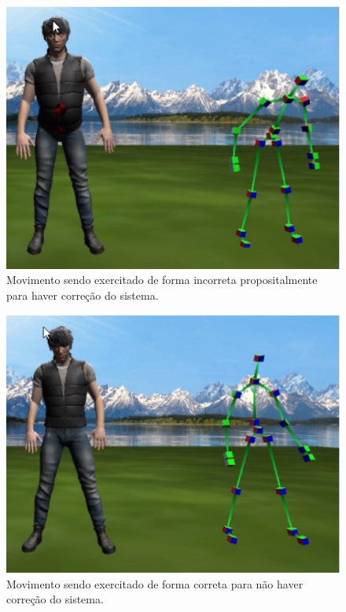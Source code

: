   \begin{figure}[H]
  \centering
  \includegraphics [keepaspectratio=true,scale=0.60]{figuras/colunaErrada.eps}
  \caption{Movimento sendo exercitado de forma incorreta propositalmente para haver correção do sistema.}
  \label{img:colunaErrada}
  \end{figure}

  \begin{figure}[H]
  \centering
  \includegraphics [keepaspectratio=true,scale=0.60]{figuras/cabecaCerta.eps}
  \caption{Movimento sendo exercitado de forma correta para não haver correção do sistema.}
  \label{img:colunaCerta}
  \end{figure}

